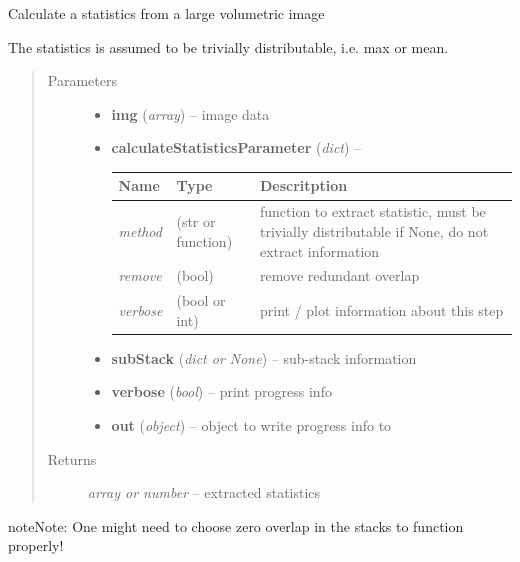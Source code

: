 \documentclass[letterpaper,10pt,english]{sphinxmanual}
\begin{document}
\begin{fulllineitems}
\label{api/ClearMap.ImageProcessing:ClearMap.ImageProcessing.ImageStatistics.calculateStatisticsOnStack}
Calculate a statistics from a large volumetric image

The statistics is assumed to be trivially distributable, i.e. max or mean.
\begin{quote}\begin{description}
\item[{Parameters}] \leavevmode\begin{itemize}
\item {} 
\textbf{img} (\emph{array}) --
image data

\item {} 
\textbf{calculateStatisticsParameter} (\emph{dict}) --

\begin{tabulary}{\linewidth}{|L|L|L|}
\hline
\textsf{\relax 
Name
} & \textsf{\relax 
Type
} & \textsf{\relax 
Descritption
}\\
\hline
\emph{method}
 & 
(str or function)
 & 
function to extract statistic, must be trivially distributable
if None, do not extract information
\\
\hline
\emph{remove}
 & 
(bool)
 & 
remove redundant overlap
\\
\hline
\emph{verbose}
 & 
(bool or int)
 & 
print / plot information about this step
\\
\hline\end{tabulary}


\item {} 
\textbf{subStack} (\emph{dict or None}) --
sub-stack information

\item {} 
\textbf{verbose} (\emph{bool}) --
print progress info

\item {} 
\textbf{out} (\emph{object}) --
object to write progress info to

\end{itemize}

\item[{Returns}] \leavevmode
\emph{array or number} --
extracted statistics

\end{description}\end{quote}

\begin{notice}{note}{Note:}
One might need to choose zero overlap in the stacks to function properly!
\end{notice}

\end{fulllineitems}
\end{document}
